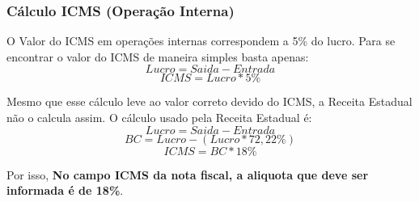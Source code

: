 \documentclass{article}
\begin{document}
\subsubsection{Cálculo ICMS (Operação Interna)}
O Valor do ICMS em operações internas correspondem a 5\% do lucro. Para se encontrar o valor do ICMS de maneira simples basta apenas:
$$ Lucro = Saida - Entrada $$
$$ICMS = Lucro * 5\%$$

Mesmo que esse cálculo leve ao valor correto devido do ICMS, a Receita Estadual não o calcula assim. O cálculo usado pela Receita Estadual é:
$$ Lucro = Saida - Entrada $$
$$ BC = Lucro - (Lucro * 72,22\%) $$
$$ ICMS = BC * 18\% $$

Por isso, \textbf{No campo ICMS da nota fiscal, a aliquota que deve ser informada é de 18\%}.
\label{emissaonfe:infos-ad-icms}

\pagebreak
\end{document}
